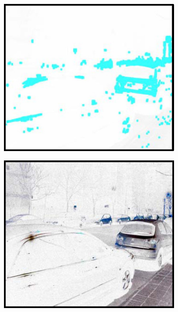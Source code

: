 \documentclass[a4paper, 10pt]{article}
\begin{document}
\begin{figure}[htbp]
\begin{subfigure}{0.18\textwidth}
			\captionsetup{font=scriptsize}
			\label{fig: Inversed}
		\end{subfigure}
		\begin{subfigure}{0.18\textwidth}
			\includegraphics[width=\linewidth]{picture/LLIE/Inverse/marked image}
			\captionsetup{font=scriptsize}
			\label{fig: marked image}	
		\end{subfigure}
		\begin{subfigure}{0.18\textwidth}
			\includegraphics[width=\linewidth]{picture/LLIE/Inverse/de-haze}

\end{subfigure}
\end{figure}
\end{document}
